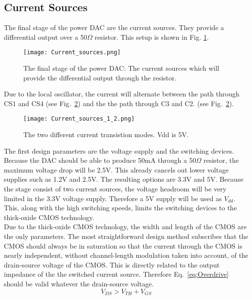 
\subsection{Current Sources}\label{sec:currentsources}
The final stage of the power DAC are the current sources. They provide a differential output over a 50$\Omega$ resistor. This setup is shown in Fig. \ref{figure:Current_sources}.
\begin{figure}[h!]
\begin{center}
\texttt{[image: Current\_sources.png]}
\caption{The final stage of the power DAC: The current sources which will provide the differential output through the resistor.}
\label{figure:Current_sources}
\end{center}
\end{figure}
Due to the local oscillator, the current will alternate between the path through CS1 and CS4 (see Fig.~\ref{fig:CS1}) and the the path through C3 and C2. (see Fig.~\ref{fig:CS1}). 
\begin{figure}
\centering
\texttt{[image: Current\_sources\_1\_2.png]}
\caption{The two different current transistion modes. Vdd is 5V.}
\label{fig:CS1}
\end{figure}
The first design parameters are the voltage supply and the switching devices. Because the DAC should be able to produce 50mA through a 50$\Omega$ resistor, the maximum voltage drop will be 2.5V. This already cancels out lower voltage supplies such as 1.2V and 2.5V. The resulting options are 3.3V and 5V. Because the stage consist of two current sources, the voltage headroom will be very limited in the 3.3V voltage supply. Therefore a 5V supply will be used as $V_{dd}$. This, along with the high switching speeds, limits the switching devices to the thick-oxide CMOS technology.\\
Due to the thick-oxide CMOS technology, the width and length of the CMOS are the only parameters. The most straightforward design method subscribes that the CMOS should always be in saturation so that the current through the CMOS is nearly independent, without channel-length modulation taken into account, of the drain-source voltage of the CMOS. This is directly related to the output impedance of the the switched current source. Therefore Eq.~\ref{eq:Overdrive} should be valid whatever the drain-source voltage.\\

\begin{equation}\label{eq:Overdrive}{V_{DS} > V_{TH} + V_{GS}}\end{equation}

